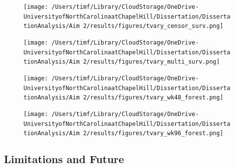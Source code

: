 \documentclass{beamer}
\begin{document}
\begin{frame}
    \begin{figure}[H] 
        \centering
        \texttt{[image: /Users/timf/Library/CloudStorage/OneDrive-UniversityofNorthCarolinaatChapelHill/Dissertation/DissertationAnalysis/Aim 2/results/figures/tvary\_censor\_surv.png]} 

        \caption*{} 
        \label{fig:cens_surv} %
    \end{figure}

\end{frame}

\begin{frame}
    \begin{figure}[H] 
        \centering
        \texttt{[image: /Users/timf/Library/CloudStorage/OneDrive-UniversityofNorthCarolinaatChapelHill/Dissertation/DissertationAnalysis/Aim 2/results/figures/tvary\_multi\_surv.png]} 

        \caption*{} 
        \label{fig:mutli_surv} %
    \end{figure}
\end{frame}

\begin{frame}
     \begin{figure}[H] 
           \centering
            \texttt{[image: /Users/timf/Library/CloudStorage/OneDrive-UniversityofNorthCarolinaatChapelHill/Dissertation/DissertationAnalysis/Aim 2/results/figures/tvary\_wk48\_forest.png]} 
            \caption*{} 
            \label{fig:48wk_forest} %
     \end{figure} 
\end{frame}

\begin{frame}
    \begin{figure}[H] 
        \centering
        \texttt{[image: /Users/timf/Library/CloudStorage/OneDrive-UniversityofNorthCarolinaatChapelHill/Dissertation/DissertationAnalysis/Aim 2/results/figures/tvary\_wk96\_forest.png]} 
        \caption*{} 
        \label{fig:96wk_forest} %
    \end{figure}  
\end{frame}
    
 
 \subsection{Limitations and Future}
    
\end{document}
